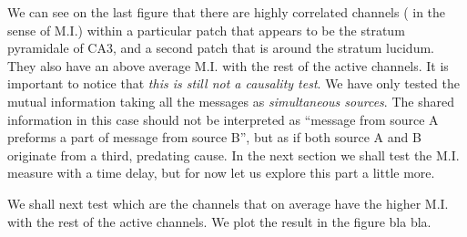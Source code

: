 \documentclass[10pt]{article}
\begin{document}
We can see on the last figure that there are highly correlated channels ( in the
sense of M.I.) within a particular patch that appears to be the stratum pyramidale of
CA3, and a second patch that is around the stratum lucidum. They also have an
above average M.I. with the rest of the active channels. It is important to notice
that \emph{ this is still not a causality test}. We have only tested the mutual
information taking all the messages as \emph{simultaneous sources}. The shared
information in this case should not be interpreted as ``message from source
A preforms a part of message from source B'', but as if both source A and B originate
from a third, predating cause. In the next section we shall test the M.I.
measure with a time delay, but for now let us explore this part a little more.

We shall next test which are the channels that on average have
the higher M.I. with the rest of the active channels. We plot the result in
the figure bla bla.





{}

\end{document}
